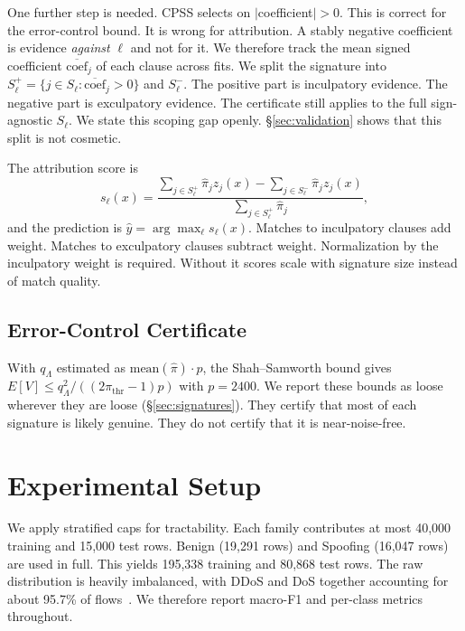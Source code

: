 \documentclass[conference]{IEEEtran}
\begin{document}
One further step is needed. CPSS selects on $|$coefficient$|>0$. This is
correct for the error-control bound. It is wrong for attribution. A stably
negative coefficient is evidence \emph{against} $\ell$ and not for it. We
therefore track the mean signed coefficient
$\overline{\mathrm{coef}}_j$ of each clause across fits. We split the
signature into
$S_\ell^{+} = \{j \in S_\ell : \overline{\mathrm{coef}}_j > 0\}$
and $S_\ell^{-}$. The positive part is inculpatory evidence. The negative
part is exculpatory evidence. The certificate still applies to the full
sign-agnostic $S_\ell$. We state this scoping gap openly.
\S\ref{sec:validation} shows that this split is not cosmetic.

The attribution score is
\begin{equation}
s_\ell(x) = \frac{\sum_{j \in S_\ell^{+}} \hat{\pi}_j z_j(x) - \sum_{j \in S_\ell^{-}} \hat{\pi}_j z_j(x)}{\sum_{j \in S_\ell^{+}} \hat{\pi}_j},
\label{eq:score}
\end{equation}
and the prediction is $\hat{y} = \arg\max_\ell s_\ell(x)$. Matches to
inculpatory clauses add weight. Matches to exculpatory clauses subtract
weight. Normalization by the inculpatory weight is required. Without it
scores scale with signature size instead of match quality.

\subsection{Error-Control Certificate}
\label{sec:cert}
With $q_\Lambda$ estimated as $\mathrm{mean}(\hat{\pi}) \cdot p$, the
Shah--Samworth bound gives
$E[V] \le q_\Lambda^2 / ((2\pi_{\mathrm{thr}} - 1) p)$ with $p = 2400$. We
report these bounds as loose wherever they are loose
(\S\ref{sec:signatures}). They certify that most of each signature is
likely genuine. They do not certify that it is near-noise-free.

\section{Experimental Setup}
\label{sec:setup}
 We apply stratified caps for tractability. Each family
contributes at most 40{,}000 training and 15{,}000 test rows. Benign
(19{,}291 rows) and Spoofing (16{,}047 rows) are used in full. This yields
195{,}338 training and 80{,}868 test rows. The raw distribution is heavily
imbalanced, with DDoS and DoS together accounting for about 95.7\% of
flows~\cite{dadkhah2024}. We therefore report macro-F1 and per-class
metrics throughout.
\end{document}
